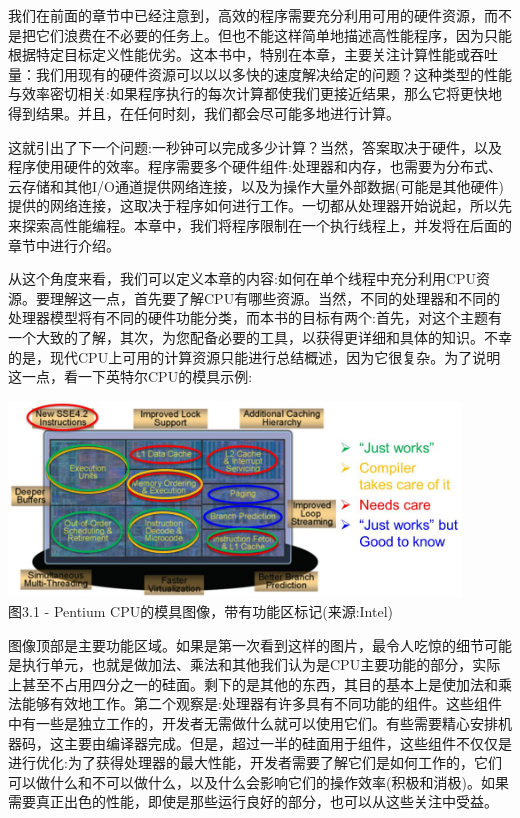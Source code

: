 我们在前面的章节中已经注意到，高效的程序需要充分利用可用的硬件资源，而不是把它们浪费在不必要的任务上。但也不能这样简单地描述高性能程序，因为只能根据特定目标定义性能优劣。这本书中，特别在本章，主要关注计算性能或吞吐量：我们用现有的硬件资源可以以以多快的速度解决给定的问题？这种类型的性能与效率密切相关:如果程序执行的每次计算都使我们更接近结果，那么它将更快地得到结果。并且，在任何时刻，我们都会尽可能多地进行计算。

这就引出了下一个问题:一秒钟可以完成多少计算？当然，答案取决于硬件，以及程序使用硬件的效率。程序需要多个硬件组件:处理器和内存，也需要为分布式、云存储和其他I/O通道提供网络连接，以及为操作大量外部数据(可能是其他硬件)提供的网络连接，这取决于程序如何进行工作。一切都从处理器开始说起，所以先来探索高性能编程。本章中，我们将程序限制在一个执行线程上，并发将在后面的章节中进行介绍。

从这个角度来看，我们可以定义本章的内容:如何在单个线程中充分利用CPU资源。要理解这一点，首先要了解CPU有哪些资源。当然，不同的处理器和不同的处理器模型将有不同的硬件功能分类，而本书的目标有两个:首先，对这个主题有一个大致的了解，其次，为您配备必要的工具，以获得更详细和具体的知识。不幸的是，现代CPU上可用的计算资源只能进行总结概述，因为它很复杂。为了说明这一点，看一下英特尔CPU的模具示例:

\begin{center}
\includegraphics[width=0.9\textwidth]{content/1/chapter3/images/1.jpg}\\
图3.1 - Pentium CPU的模具图像，带有功能区标记(来源:Intel)
\end{center}

图像顶部是主要功能区域。如果是第一次看到这样的图片，最令人吃惊的细节可能是执行单元，也就是做加法、乘法和其他我们认为是CPU主要功能的部分，实际上甚至不占用四分之一的硅面。剩下的是其他的东西，其目的基本上是使加法和乘法能够有效地工作。第二个观察是:处理器有许多具有不同功能的组件。这些组件中有一些是独立工作的，开发者无需做什么就可以使用它们。有些需要精心安排机器码，这主要由编译器完成。但是，超过一半的硅面用于组件，这些组件不仅仅是进行优化:为了获得处理器的最大性能，开发者需要了解它们是如何工作的，它们可以做什么和不可以做什么，以及什么会影响它们的操作效率(积极和消极)。如果需要真正出色的性能，即使是那些运行良好的部分，也可以从这些关注中受益。

